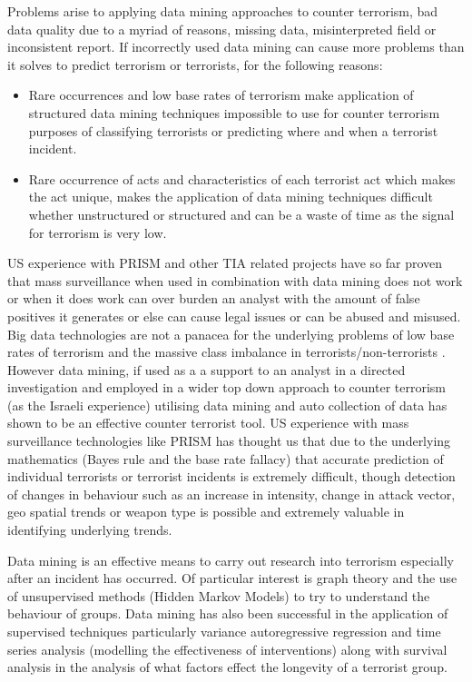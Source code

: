 Problems arise to applying data mining approaches to counter terrorism, bad data quality due to a myriad of reasons, missing data, misinterpreted field or inconsistent report.
If incorrectly used data mining can cause more problems than it solves to predict terrorism or terrorists, for the following reasons:
\begin{itemize}
\item Rare occurrences and low base rates of terrorism make application of structured data mining techniques impossible to use for counter terrorism purposes of classifying terrorists or predicting where and when a terrorist incident.
\item Rare occurrence of acts and characteristics of each terrorist act which  makes the act unique, makes the application of data mining techniques difficult whether unstructured or structured and can be a waste of time as the signal for terrorism is very low.
\end{itemize}

US experience with PRISM and other TIA related projects have so far proven that mass surveillance when used in combination with data mining does not work or when it does work  can over burden an analyst with the amount of false positives it generates or else can cause legal issues or can be abused and misused. 
Big data technologies are not a panacea for the underlying problems of low base rates of terrorism and the massive class imbalance in terrorists/non-terrorists \citep{Masssurvelilancefail2015}. However data mining, if used as a a support to an analyst in a directed investigation and employed in a wider top down approach to counter terrorism (as the Israeli experience) utilising data mining and auto collection of data has shown to be an effective counter terrorist tool. US experience with mass surveillance technologies like PRISM has thought us that due to the underlying mathematics (Bayes rule and the base rate fallacy) \citep{schneier2015data} that accurate prediction of individual terrorists or terrorist incidents is extremely difficult, though detection of changes in behaviour such as an increase in intensity, change in attack vector, geo spatial trends or weapon type is possible and extremely valuable in identifying underlying trends. 

Data mining is an effective means to carry out research into terrorism especially after an incident has occurred. Of particular interest is graph theory and the use of unsupervised methods (Hidden Markov Models) to try to understand the behaviour of groups. Data mining has also been successful in the application of supervised techniques particularly variance autoregressive regression and time series analysis (modelling the effectiveness of interventions) along with survival analysis in the analysis of what factors effect the longevity of a terrorist group.  

 

